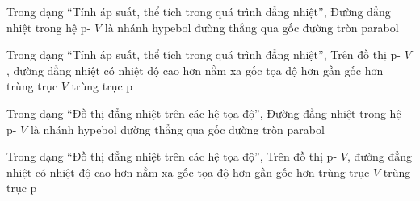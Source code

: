 \begin{ex}
Trong dạng “Tính áp suất, thể tích trong quá trình đẳng nhiệt”, Đường đẳng nhiệt trong hệ p- $V$ là
\choice
{\True nhánh hypebol}
{đường thẳng qua gốc}
{đường tròn}
{parabol}
\end{ex}

\begin{ex}
Trong dạng “Tính áp suất, thể tích trong quá trình đẳng nhiệt”, Trên đồ thị p- $V$, đường đẳng nhiệt có nhiệt độ cao hơn nằm
\choice
{\True xa gốc tọa độ hơn}
{gần gốc hơn}
{trùng trục $V$}
{trùng trục p}
\end{ex}

\begin{ex}
Trong dạng “Đồ thị đẳng nhiệt trên các hệ tọa độ”, Đường đẳng nhiệt trong hệ p- $V$ là
\choice
{\True nhánh hypebol}
{đường thẳng qua gốc}
{đường tròn}
{parabol}
\end{ex}

\begin{ex}
Trong dạng “Đồ thị đẳng nhiệt trên các hệ tọa độ”, Trên đồ thị p- $V$, đường đẳng nhiệt có nhiệt độ cao hơn nằm
\choice
{\True xa gốc tọa độ hơn}
{gần gốc hơn}
{trùng trục $V$}
{trùng trục p}
\end{ex}
